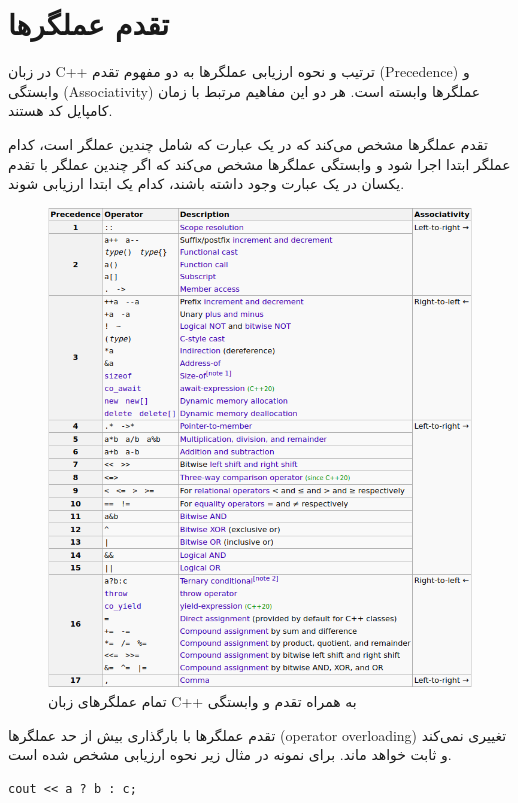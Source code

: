 \documentclass{article}
\begin{document}
\section*{تقدم عملگر‌ها}

در زبان C++ ترتیب و نحوه ارزیابی عملگر‌ها به دو مفهوم تقدم (Precedence) و وابستگی (Associativity) عملگر‌ها وابسته است. هر دو این مفاهیم مرتبط با زمان کامپایل کد هستند.

تقدم عملگرها مشخص می‌کند که در یک عبارت که شامل چندین عملگر است، کدام عملگر ابتدا اجرا شود و وابستگی عملگرها مشخص می‌کند که اگر چندین عملگر با تقدم یکسان در یک عبارت وجود داشته باشند، کدام یک ابتدا ارزیابی شوند.

\begin{figure}[h!]
    \centering
    \includegraphics[width=1\textwidth]{Photos/1-operations.png}
    \caption{تمام عملگرهای زبان C++ به همراه تقدم و وابستگی}
    \label{fig:example}
\end{figure}

تقدم عملگر‌ها با بارگذاری بیش از حد عملگر‌ها (operator overloading) تغییری نمی‌کند و ثابت خواهد ماند.
برای نمونه در مثال زیر نحوه ارزیابی مشخص شده است.

\begin{LTR} %
\begin{lstlisting}
cout << a ? b : c;
\end{lstlisting}
\end{LTR}
\end{document}
